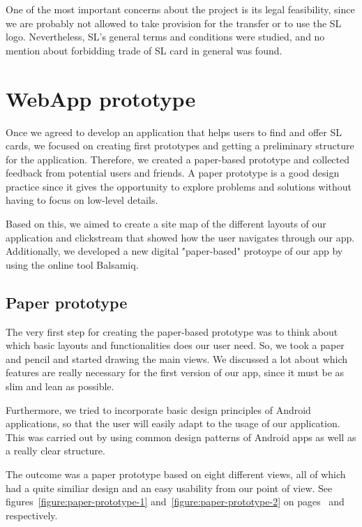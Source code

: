 \documentclass[11pt,twoside,a4paper]{report}
\begin{document}
One of the most important concerns about the project is its legal feasibility, since we are probably not allowed to take provision for the transfer or to use the SL logo. Nevertheless, SL's general terms and conditions\cite{sl} were studied, and no mention about forbidding trade of SL card in general was found.

\chapter{WebApp prototype}

Once we agreed to develop an application that helps users to find and offer SL cards, we focused on creating first prototypes and getting a preliminary structure for the application. Therefore, we created a paper-based prototype and collected feedback from potential users and friends. A paper prototype is a good design practice since it gives the opportunity to explore problems and solutions without having to focus on low-level details\cite[p. 263-274]{sitemaps}.

Based on this, we aimed to create a site map of the different layouts of our application and clickstream that showed how the user navigates through our app. Additionally, we developed a new digital "paper-based" protoype of our app by using the online tool Balsamiq.

\section{Paper prototype}

The very first step for creating the paper-based prototype was to think about which basic layouts and functionalities does our user need. So, we took a paper and pencil and started drawing the main views. We discussed a lot about which features are really necessary for the first version of our app, since it must be as slim and lean as possible.

Furthermore, we tried to incorporate basic design principles of Android applications\cite{principles}, so that the user will easily adapt to the usage of our application. This was carried out by using common design patterns of Android apps as well as a really clear structure.

The outcome was a paper prototype based on eight different views, all of which had a quite similiar design and an easy usability from our point of view. See figures~\ref{figure:paper-prototype-1} and~\ref{figure:paper-prototype-2} on pages~\pageref{figure:paper-prototype-1} and~\pageref{figure:paper-prototype-2} respectively.
\end{document}

